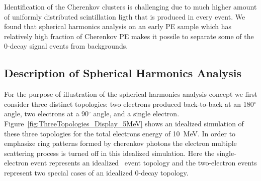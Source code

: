 Identification of the Cherenkov clusters is challenging due to much higher amount of uniformly distributed scintillation ligth that is
produced in every event. We found that spherical harmonics analysis on an early PE sample which has relatively high fraction of 
Cherenkov PE makes it possile to separate some of the 0\nbb-decay signal events from backgrounds.

\subsection{Description of Spherical Harmonics Analysis}

For the purpose of illustration of the spherical harmonics analysis concept we first consider three distinct topologies: 
two electrons produced back-to-back at an 180$^{\circ}$ angle, two electrons at a 90$^{\circ}$ angle, and a single electron.
Figure~\ref{fig:ThreeTopologies_Display_5MeV} shows an idealized simulation of these three topologies for the total electrons 
energy of 10~MeV. In order to emphasize ring patterns formed by cherenkov photons the electron multiple scattering process is turned off
in this idealized simulation. Here the single-electron event represents an idealized \B~event topology and the two-electron events represent
two special cases of an idealized 0\nbb-decay topology.


